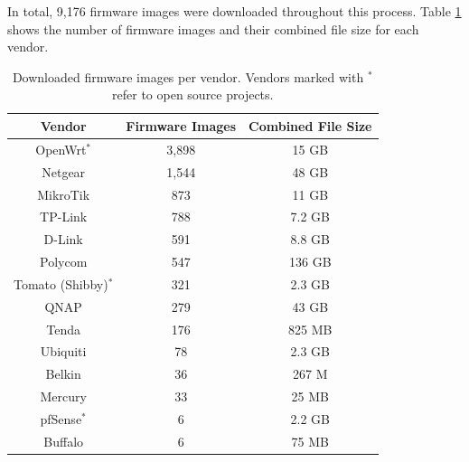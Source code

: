 In total, 9,176 firmware images were downloaded throughout this process. Table \ref{tab:scraper} shows the number of firmware images and their combined file size for each vendor.

\begin{table}[H]
\centering
\caption{Downloaded firmware images per vendor. Vendors marked with $^*$ refer to open source projects.}
\begin{tabular}{|c|c|c|}
\hline
\textbf{Vendor} & \textbf{Firmware Images} & \textbf{Combined File Size} \\ \hline
OpenWrt$^*$     & 3,898                     & 15 GB                       \\ 
Netgear         & 1,544                     & 48 GB                       \\ 
MikroTik        & 873                      & 11 GB                       \\ 
TP-Link         & 788                      & 7.2 GB                      \\ 
D-Link          & 591                      & 8.8 GB                      \\ 
Polycom         & 547                      & 136 GB                      \\ 
Tomato (Shibby)$^*$ & 321                      & 2.3 GB                      \\ 
QNAP            & 279                      & 43 GB                       \\ 
Tenda           & 176                      & 825 MB                      \\ 
Ubiquiti        & 78                       & 2.3 GB                      \\ 
Belkin          & 36                       & 267 M                       \\ 
Mercury         & 33                       & 25 MB                       \\ 
pfSense$^*$     & 6                        & 2.2 GB                      \\ 
Buffalo         & 6                        & 75 MB                       \\ \hline

\end{tabular}
\label{tab:scraper}
\end{table}


